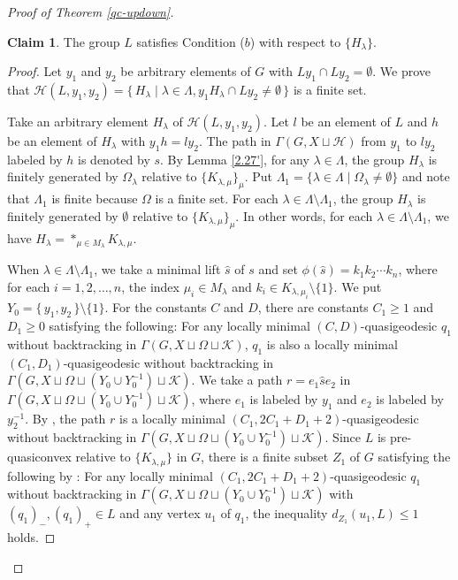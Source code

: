 \documentclass{amsart}
\theoremstyle{definition}
\newtheorem{Claim}[Thm]{Claim}
\begin{document}
\begin{proof}[Proof of Theorem \ref{qc-updown}]
\begin{Claim}\label{claim2}
The group $L$ satisfies Condition ($b$) with respect to $\{H_\lambda\}$. 
\end{Claim}

\begin{proof}
Let $y_1$ and $y_2$ be arbitrary elements of $G$ with $Ly_1\cap Ly_2=\emptyset$. 
We prove that ${\mathscr{H}}(L,y_1,y_2)=\{\, H_\lambda \mid \lambda \in \Lambda, y_1H_\lambda\cap Ly_2\ne\emptyset\,\}$ is a finite set. 

Take an arbitrary element $H_\lambda$ of ${\mathscr{H}}(L,y_1,y_2)$. 
Let $l$ be an element of $L$ and $h$ be an element of $H_\lambda$ with $y_1h=ly_2$. 
The path in $\Gamma(G,X\sqcup{\mathcal H})$ from $y_1$ to $ly_2$ labeled by $h$ is denoted by $s$. 
By Lemma \ref{2.27'}, for any $\lambda\in\Lambda$, the group $H_\lambda$ is finitely generated by $\Omega_\lambda$ relative to $\{K_{\lambda,\mu}\}_\mu$. 
Put $\Lambda_1=\{\lambda \in \Lambda \mid \Omega_\lambda\ne \emptyset\}$ and note that $\Lambda_1$ is finite because $\Omega$ is a finite set. 
For each $\lambda\in\Lambda\setminus \Lambda_1$, the group $H_\lambda$ is finitely generated by $\emptyset$ relative to $\{K_{\lambda,\mu}\}_\mu$. 
In other words, for each $\lambda\in \Lambda\setminus \Lambda_1$, we have $H_\lambda=\ast_{\mu \in M_\lambda}K_{\lambda,\mu}$. 

When $\lambda\in\Lambda\setminus\Lambda_1$, we take a minimal lift $\widehat{s}$ of $s$ and set $\phi(\widehat{s})=k_1k_2\cdots k_n$, where for each $i=1,2,\ldots,n$, the index $\mu_i\in M_\lambda$ and $k_i\in K_{\lambda,\mu_i}\setminus \{1\}$. 
We put $Y_0=\{\,y_1,y_2\,\}\setminus \{1\}$. 
For the constants $C$ and $D$, there are constants $C_1 \geq 1$ and $D_1 \geq 0$ satisfying the following:
For any locally minimal $(C, D)$-quasigeodesic $q_1$ without backtracking in $\Gamma(G,X \sqcup \Omega \sqcup {\mathcal K})$, $q_1$ is also a locally minimal $(C_1,D_1)$-quasigeodesic without backtracking in $\Gamma(G,X \sqcup \Omega \sqcup (Y_0\cup Y_0^{-1}) \sqcup {\mathcal K})$.
We take a path $r=e_1\widehat{s}e_2$ in $\Gamma(G,X\sqcup\Omega\sqcup (Y_0\cup Y_0^{-1}) \sqcup{\mathcal K})$, where $e_1$ is labeled by $y_1$ and $e_2$ is labeled by $y_2^{-1}$. 
By \cite[Lemma 3.5]{Osi06}, the path $r$ is a locally minimal $(C_1,2C_1+D_1+2)$-quasigeodesic without backtracking in $\Gamma(G,X\sqcup\Omega\sqcup (Y_0\cup Y_0^{-1}) \sqcup{\mathcal K})$. 
Since $L$ is pre-quasiconvex relative to $\{K_{\lambda,\mu}\}$ in $G$, there is a finite subset $Z_1$ of $G$ satisfying the following by \cite[Theorem 2.14]{MP08}: 
For any locally minimal $(C_1,2C_1+D_1+2)$-quasigeodesic $q_1$ without backtracking in $\Gamma(G,X\sqcup\Omega\sqcup (Y_0\cup Y_0^{-1})\sqcup{\mathcal K})$ with $(q_1)_-,(q_1)_+\in L$ and any vertex $u_1$ of $q_1$, the inequality $d_{Z_1}(u_1,L)\leq 1$ holds. 


\end{proof}
\end{proof}
\end{document}
